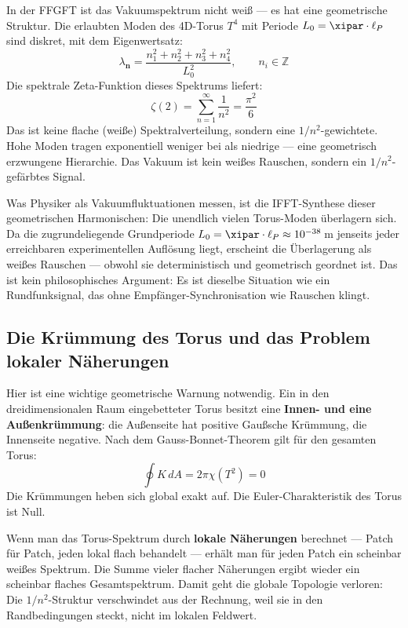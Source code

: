 In der FFGFT ist das Vakuumspektrum nicht weiß — es hat eine geometrische Struktur.
Die erlaubten Moden des 4D-Torus $T^4$ mit Periode $L_0 = \xipar \cdot \ell_P$ sind
diskret, mit dem Eigenwertsatz:
\begin{equation}
    \lambda_\mathbf{n} = \frac{n_1^2 + n_2^2 + n_3^2 + n_4^2}{L_0^2},
    \qquad n_i \in \mathbb{Z}
\end{equation}
Die spektrale Zeta-Funktion dieses Spektrums liefert:
\begin{equation}
    \zeta(2) = \sum_{n=1}^{\infty} \frac{1}{n^2} = \frac{\pi^2}{6}
\end{equation}
Das ist keine flache (weiße) Spektralverteilung, sondern eine $1/n^2$-gewichtete.
Hohe Moden tragen exponentiell weniger bei als niedrige — eine geometrisch erzwungene
Hierarchie. Das Vakuum ist kein weißes Rauschen, sondern ein $1/n^2$-gefärbtes Signal.

\begin{interpretation}
Was Physiker als Vakuumfluktuationen messen, ist die IFFT-Synthese dieser
geometrischen Harmonischen: Die unendlich vielen Torus-Moden überlagern sich.
Da die zugrundeliegende Grundperiode $L_0 = \xipar \cdot \ell_P \approx 10^{-38}$\,m
jenseits jeder erreichbaren experimentellen Auflösung liegt, erscheint die Überlagerung
als weißes Rauschen — obwohl sie deterministisch und geometrisch geordnet ist.
Das ist kein philosophisches Argument: Es ist dieselbe Situation wie ein
Rundfunksignal, das ohne Empfänger-Synchronisation wie Rauschen klingt.
\end{interpretation}

\subsection{Die Krümmung des Torus und das Problem lokaler Näherungen}

Hier ist eine wichtige geometrische Warnung notwendig. Ein in den dreidimensionalen
Raum eingebetteter Torus besitzt eine \textbf{Innen- und eine Außenkrümmung}:
die Außenseite hat positive Gaußsche Krümmung, die Innenseite negative. Nach dem
Gauss-Bonnet-Theorem gilt für den gesamten Torus:
\begin{equation}
    \oint K \, dA = 2\pi \chi(T^2) = 0
\end{equation}
Die Krümmungen heben sich global exakt auf. Die Euler-Charakteristik des Torus
ist Null.

\begin{important}
Wenn man das Torus-Spektrum durch \textbf{lokale Näherungen} berechnet —
Patch für Patch, jeden lokal flach behandelt — erhält man für jeden Patch
ein scheinbar weißes Spektrum. Die Summe vieler flacher Näherungen ergibt
wieder ein scheinbar flaches Gesamtspektrum. Damit geht die globale Topologie
verloren: Die $1/n^2$-Struktur verschwindet aus der Rechnung, weil sie in den
Randbedingungen steckt, nicht im lokalen Feldwert.
\end{important}

